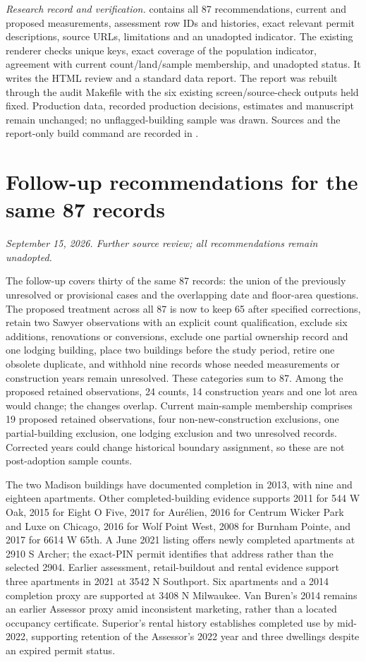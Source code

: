 \textit{Research record and verification.}
contains all 87 recommendations, current and proposed measurements,
assessment row IDs and histories, exact relevant permit descriptions,
source URLs, limitations and an unadopted indicator. The existing
renderer checks unique keys, exact coverage of the population indicator,
agreement with current count/land/sample membership, and unadopted
status. It writes the HTML review and a standard data report. The
report was rebuilt through the audit Makefile with the six existing
screen/source-check outputs held fixed. Production data, recorded
production decisions, estimates and manuscript remain unchanged; no
unflagged-building sample was drawn. Sources and the report-only build
command are recorded in .

\clearpage
\section*{Follow-up recommendations for the same 87 records}
\textit{September 15, 2026. Further source review; all recommendations remain unadopted.}

The follow-up covers thirty of the same 87 records: the union of the
previously unresolved or provisional cases and the overlapping date
and floor-area questions. The proposed treatment across all 87 is now
to keep 65 after specified corrections, retain two Sawyer observations
with an explicit count qualification, exclude six additions,
renovations or conversions, exclude one partial ownership record and
one lodging building, place two buildings before the study period,
retire one obsolete duplicate, and withhold nine records whose needed
measurements or construction years remain unresolved. These categories
sum to 87. Among the proposed retained observations, 24 counts,
14 construction years and one lot area would change; the changes
overlap. Current main-sample membership comprises 19 proposed retained
observations, four non-new-construction exclusions, one partial-building
exclusion, one lodging exclusion and two unresolved records. Corrected
years could change historical boundary assignment, so these are not
post-adoption sample counts.

The two Madison buildings have documented completion in 2013, with
nine and eighteen apartments. Other completed-building evidence supports
2011 for 544 W Oak, 2015 for Eight O Five, 2017 for Aur\'elien, 2016 for
Centrum Wicker Park and Luxe on Chicago, 2016 for Wolf Point West,
2008 for Burnham Pointe, and 2017 for 6614 W 65th. A June 2021 listing
offers newly completed apartments at 2910 S Archer; the exact-PIN permit
identifies that address rather than the selected 2904. Earlier assessment,
retail-buildout and rental evidence support three apartments in 2021
at 3542 N Southport. Six apartments and a 2014 completion proxy are
supported at 3408 N Milwaukee. Van Buren's 2014 remains an earlier
Assessor proxy amid inconsistent marketing, rather than a located
occupancy certificate. Superior's rental history establishes completed
use by mid-2022, supporting retention of the Assessor's 2022 year and
three dwellings despite an expired permit status.

